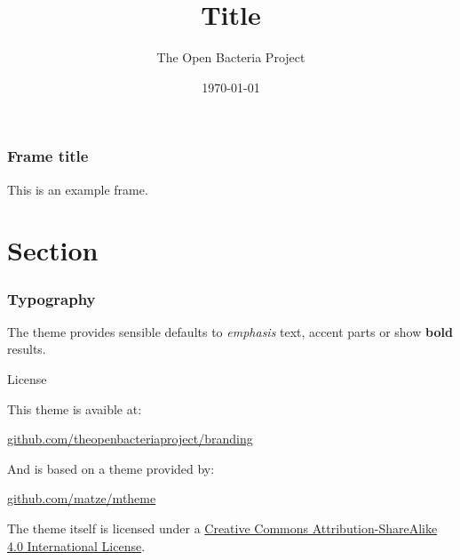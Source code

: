 \documentclass[10pt, compress]{beamer}
\title{Title}
\subtitle{}
\date{\today}
\author{The Open Bacteria Project}
\institute{\begin{center}\texttt{[image: images/Logo.png]}\end{center}}
\begin{document}
\maketitle

\begin{frame}[fragile]
  \frametitle{Frame title}
  This is an example frame.
\end{frame}

\section{Section}

\begin{frame}[fragile]
    \frametitle{Typography}
        The theme provides sensible defaults to \emph{emphasis} text, \alert{accent} parts or show \textbf{bold} results.
\end{frame}


\begin{frame}{License}
    
    This theme is avaible at:
    
    \begin{center}\url{github.com/theopenbacteriaproject/branding}\end{center}
    
    And is based on a theme provided by:

    \begin{center}\url{github.com/matze/mtheme}\end{center}

  The theme itself is licensed under a
  \href{http://creativecommons.org/licenses/by-sa/4.0/}{Creative Commons
  Attribution-ShareAlike 4.0 International License}.

  \begin{center}\ccbysa\end{center}

\end{frame}

\end{document}
